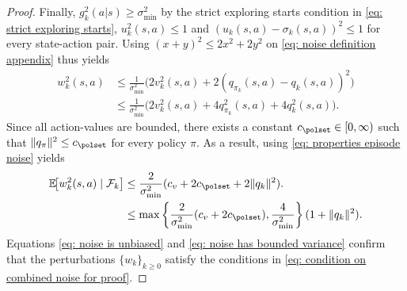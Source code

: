 \begin{proof}
Finally,
$g_k^2(a | s) \ge \sigma_{\min}^2$ by the strict exploring starts condition in \eqref{eq: strict exploring starts},
$u_k^2(s,a) \le 1$ 
and $(u_k(s,a) - \sigma_k(s,a))^2 \le 1$ for every state-action pair.
Using $(x+y)^2 \le 2 x^2 + 2 y^2$ on \eqref{eq: noise definition appendix} thus yields
\begin{align*} 
w_k^2(s,a) 
&\le
\frac{1}{\sigma_{\min}^2} \big( 2 v_k^2(s,a) + 2 (q_{\pi_k}(s,a)-q_k(s,a) )^2 \big)
\\
&\le
\frac{1}{\sigma_{\min}^2} \big( 2 v_k^2(s,a) + 4 q_{\pi_k}^2(s,a) + 4 q_k^2(s,a) \big) .
\end{align*}
Since all action-values are bounded,
there exists a constant $c_\polset \in [0,\infty)$ such that $\|q_\pi\|^2 \leq c_\polset$ for every policy $\pi$. 
As a result, using \eqref{eq: properties episode noise} yields
\begin{align}
\nonumber
\mathbb E \!\big[ w_k^2(s,a) \mid \mathcal F_k \big]
&\le
\frac{2}{\sigma_{\min}^2} ( c_v + 2 c_\polset + 2 \|q_k\|^2 ) .
\\
\label{eq: noise has bounded variance}
&\le
\max\left\{ \frac{2}{\sigma_{\min}^2} ( c_v + 2 c_\polset), \frac{4}{\sigma_{\min}^2} \right\} ( 1 + \|q_k\|^2 ) .
\end{align}
Equations \eqref{eq: noise is unbiased} and \eqref{eq: noise has bounded variance} confirm that the perturbations $\{w_k\}_{k \ge 0}$ satisfy the conditions in \eqref{eq: condition on combined noise for proof}.
\end{proof}




